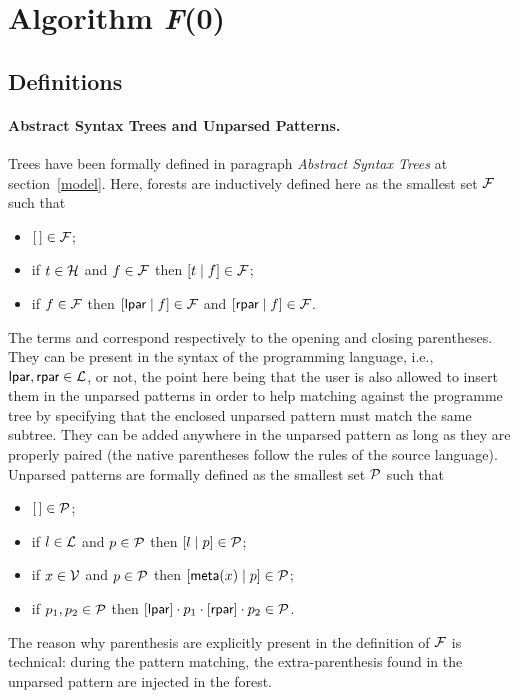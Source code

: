 
\section{Algorithm \textit{F}(0)}
\label{f0}

\subsection{Definitions}

\paragraph{Abstract Syntax Trees and Unparsed Patterns.}

Trees have been formally defined in paragraph \emph{Abstract Syntax
  Trees} at section~\ref{model}. Here, forests are inductively defined
here as the smallest set \(\cal F\) such that
\begin{itemize}

  \item \([\,] \in {\cal F}\);

  \item if \(t \in {\cal H}\) and \(f \in {\cal F}\) then
    \([{t}\mid{f}] \in {\cal F}\);

  \item if \(f \in {\cal F}\) then \([{\textsf{lpar}}\mid{f}] \in {\cal F}\) and
    \([{\textsf{rpar}}\mid{f}] \in {\cal F}\).

\end{itemize}
The terms \lpar and \lpar correspond respectively to the opening and
closing parentheses. They can be present in the syntax of the
programming language, i.e., \(\textsf{lpar}, \textsf{rpar} \in {\cal L}\), or not, the
point here being that the user is also allowed to insert them in the
unparsed patterns in order to help matching against the programme tree
by specifying that the enclosed unparsed pattern must match the same
subtree. They can be added anywhere in the unparsed pattern as long as
they are properly paired (the native parentheses follow the rules of
the source language). Unparsed patterns are formally defined as the
smallest set \(\cal P\) such that
\begin{itemize}

  \item \([\,] \in {\cal P}\);

  \item if \(l \in {\cal L}\) and \(p \in {\cal P}\) then
    \([{l}\mid{p}] \in {\cal P}\);

  \item if \(x \in {\cal V}\) and \(p \in {\cal P}\) then
    \([{\textsf{meta}(x)}\mid{p}] \in {\cal P}\);

  \item if \(p_1, p_2 \in {\cal P}\) then \([\textsf{lpar}] \cdot p_1 \cdot
    [\textsf{rpar}] \cdot p_2 \in {\cal P}\).

\end{itemize}
The reason why parenthesis are explicitly present in the definition of
\(\cal F\) is technical: during the pattern matching, the
extra\hyp{}parenthesis found in the unparsed pattern are injected in
the forest.


